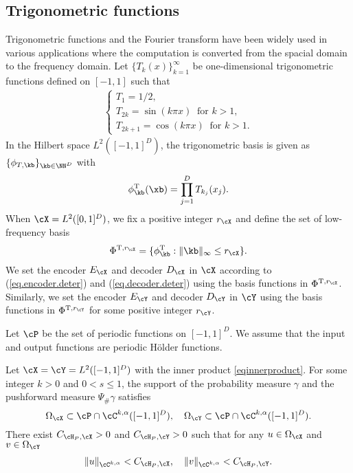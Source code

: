 \documentclass[11pt]{article} %
\begin{document}
\subsection{Trigonometric functions} 
Trigonometric functions and the Fourier transform have been widely used in various applications where the computation is converted from the spacial domain to the frequency domain. Let $\{T_k(x)\}_{k=1}^{\infty}$ be  one-dimensional trigonometric functions defined on $[-1,1]$ such that
\begin{align}
	\begin{cases}
		T_1=1/2,\\
		T_{2k}=\sin(k\pi x) \ \mbox{ for } k>1,\\
		T_{2k+1}=\cos(k\pi x) \ \mbox{ for } k>1.
	\end{cases}
\label{eq.trig}
\end{align}
In the Hilbert space $L^2([-1,1]^D)$,  the trigonometric basis is given as $\{\phi_{T,\kb}\}_{\kb\in \NN^D}$ with
\begin{align}
\phi^{\rm T}_{\kb}(\xb)=\prod_{j=1}^D T_{k_j}(x_j).
\label{eq.trig.basis}
\end{align}
When $\cX=L^2([0,1]^D)$, we fix a positive integer $r_{\cX}$ and define the set of low-frequency basis 
\begin{align*}
	\Phi^{{\rm T},r_{\cX}}=\{\phi^{\rm T}_{\kb}: \|\kb\|_{\infty}\leq r_{\cX}\}.
\end{align*}
We set the encoder $E_{\cX}$ and decoder $D_{\cX}$ in $\cX$ according to (\ref{eq.encoder.deter}) and (\ref{eq.decoder.deter}) using the basis functions in $\Phi^{{\rm T},r_{\cX}}$. Similarly, we set the encoder $E_{\cY}$ and decoder $D_{\cY}$ in $\cY$ using  the basis functions in $\Phi^{{\rm T},r_{\cY}}$ for some positive integer $r_{\cY}$.


Let $\cP$ be the set of periodic functions on $[-1,1]^D$.
We assume that the input and output functions are periodic H\"{o}lder functions.
\begin{assumption}\label{assum.holder.trig}
Let $\cX=\cY=L^2([-1,1]^D)$ with the inner product \eqref{eqinnerproduct}. For some integer $k>0$ and $0<s\leq 1$, the support of the probability measure $\gamma$ and the pushforward measure $\Psi_{\#}\gamma$ satisfies 
	$$\Omega_{\cX}\subset \cP\cap \cC^{k,\alpha}([-1,1]^D), \quad \Omega_{\cY}\subset \cP\cap \cC^{k,\alpha}([-1,1]^D).$$ There exist $C_{\cH_P,\cX}>0$ and $C_{\cH_P,\cY}>0$ such that for any $u\in \Omega_{\cX}$ and $v\in \Omega_{\cY}$
	\begin{align*}
		\|u\|_{\cC^{k,\alpha}}<C_{\cH_P,\cX},\quad \|v\|_{\cC^{k,\alpha}}<C_{\cH_P,\cY}.
	\end{align*}
\end{assumption}
\end{document}
